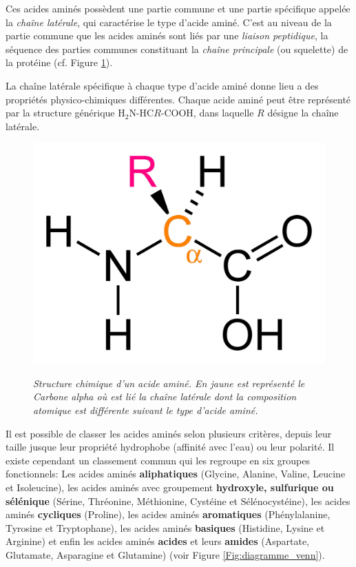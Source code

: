 Ces acides aminés possèdent une partie commune et une partie spécifique appelée la \textit{chaîne latérale}, qui caractérise le type d'acide aminé. C'est au niveau de la partie commune que les acides aminés sont liés par une \textit{liaison peptidique}, la séquence des parties communes constituant la \textit{chaîne principale} (ou squelette) de la protéine (cf. Figure \ref{Fig:amino_acid_structure}). 

La chaîne latérale spécifique à chaque type d'acide aminé donne lieu a des propriétés physico-chimiques différentes. Chaque acide aminé peut être représenté par la structure générique H$_{2}$N-HC$R$-COOH, dans laquelle $R$ désigne la chaîne latérale.

\begin{figure}
  \centering
  {\includegraphics[width=0.4\linewidth]{./figures/ch1/amino_acid_structure}}
    \caption{\it Structure chimique d'un acide aminé. En jaune est représenté le Carbone alpha où est lié la chaîne latérale dont la composition atomique est différente suivant le type d'acide aminé.}
    \label{Fig:amino_acid_structure}
  \hspace{0.3cm}
\end{figure}


Il est possible de classer les acides aminés selon plusieurs critères, depuis leur taille jusque leur propriété hydrophobe (affinité avec l'eau) ou leur polarité. Il existe cependant un classement commun qui les regroupe en six groupes fonctionnels: Les acides aminés \textbf{aliphatiques} (Glycine, Alanine, Valine, Leucine et Isoleucine), les acides aminés avec groupement \textbf{hydroxyle, sulfurique ou sélénique} (Sérine, Thréonine, Méthionine, Cystéine et Sélénocystéine), les acides aminés \textbf{cycliques} (Proline), les acides aminés \textbf{aromatiques} (Phénylalanine, Tyrosine et Tryptophane), les acides aminés \textbf{basiques} (Histidine, Lysine et Arginine) et enfin les acides aminés \textbf{acides} et leurs \textbf{amides} (Aspartate, Glutamate, Asparagine et Glutamine) (voir Figure \ref{Fig:diagramme_venn}).

